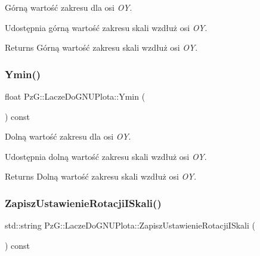 Górną wartość zakresu dla osi {\itshape OY}. 

Udostępnia górną wartość zakresu skali wzdłuż osi {\itshape OY}. \begin{DoxyReturn}{Returns}
Górną wartość zakresu skali wzdłuż osi {\itshape OY}. 
\end{DoxyReturn}
\mbox{\label{class_pz_g_1_1_lacze_do_g_n_u_plota_a9352c0382bfaeaaba9f65399a7383164}} 
\subsubsection{\texorpdfstring{Ymin()}{Ymin()}}
{\footnotesize\ttfamily float Pz\+G\+::\+Lacze\+Do\+G\+N\+U\+Plota\+::\+Ymin (\begin{DoxyParamCaption}{ }\end{DoxyParamCaption}) const\hspace{0.3cm}{\ttfamily [inline]}}



Dolną wartość zakresu dla osi {\itshape OY}. 

Udostępnia dolną wartość zakresu skali wzdłuż osi {\itshape OY}. \begin{DoxyReturn}{Returns}
Dolną wartość zakresu skali wzdłuż osi {\itshape OY}. 
\end{DoxyReturn}
\mbox{\label{class_pz_g_1_1_lacze_do_g_n_u_plota_aa92b463e8cbae31b50dd797a4183bce8}} 
\subsubsection{\texorpdfstring{ZapiszUstawienieRotacjiISkali()}{ZapiszUstawienieRotacjiISkali()}}
{\footnotesize\ttfamily std\+::string Pz\+G\+::\+Lacze\+Do\+G\+N\+U\+Plota\+::\+Zapisz\+Ustawienie\+Rotacji\+I\+Skali (\begin{DoxyParamCaption}{ }\end{DoxyParamCaption}) const\hspace{0.3cm}{\ttfamily [protected]}}



